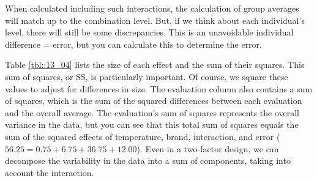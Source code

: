 \documentclass{ltjbook}
\begin{document}


When calculated including such interactions, the calculation of group averages will match up to the combination level. But, if we think about each individual's level, there will still be some discrepancies. This is an unavoidable individual difference = error, but you can calculate this to determine the error.


Table \ref{tbl::13_04} lists the size of each effect and the sum of their squares. This sum of squares, or SS, is particularly important. Of course, we square these values to adjust for differences in size. The evaluation column also contains a sum of squares, which is the sum of the squared differences between each evaluation and the overall average. The evaluation's sum of squares represents the overall variance in the data, but you can see that this total sum of squares equals the sum of the squared effects of temperature, brand, interaction, and error ($56.25=0.75+6.75+36.75+12.00$). Even in a two-factor design, we can decompose the variability in the data into a sum of components, taking into account the interaction.

\end{document}
